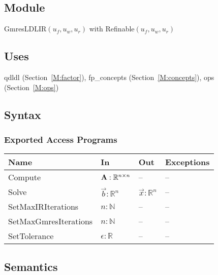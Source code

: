 \documentclass[12pt, titlepage]{article}
\begin{document}
\subsection{Module}

GmresLDLIR\((u_f, u_w, u_r)\) with Refinable\((u_f, u_w, u_r)\)

\subsection{Uses}

qdldl (Section~\ref{M:factor}), fp\_concepts (Section~\ref{M:concepts}), ops
(Section~\ref{M:ops})

\subsection{Syntax}

\subsubsection{Exported Access Programs}

\begin{center}
  \begin{tabularx}{\linewidth}{%
    p{5cm}
    >{\raggedright\arraybackslash}X
    >{\raggedright\arraybackslash}X
    >{\raggedright\arraybackslash}l
    }
    \hline
    \textbf{Name}               & \textbf{In}                   & \textbf{Out}     & \textbf{Exceptions} \\
    \hline
    Compute               & \(\mathbf{A}: \mathbb{R}^{n \times n}\) & --         & --            \\
    Solve                 & \(\vec{b}: \mathbb{R}^n\)              & \(\vec{x}: \mathbb{R}^n\) & --            \\
    SetMaxIRIterations    & \(n: \mathbb{N}\)               & --         & --            \\
    SetMaxGmresIterations & \(n: \mathbb{N}\)               & --         & --            \\
    SetTolerance          & \(\epsilon: \mathbb{R}\)               & --         & --            \\
    \hline
  \end{tabularx}
\end{center}

\subsection{Semantics}
\end{document}
